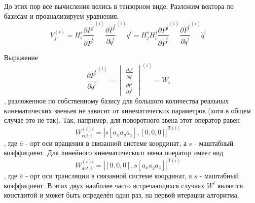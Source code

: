 \documentclass[12pt,a4paper,titlepage]{article}
\begin{document}
До этих пор все вычисления велись в тензорном виде. Разложим вектора по базисам и проанализируем уравнения.
\begin{equation}\label{basis_eq}
V^{(s)}_j = H^s_i\frac{\partial{\dot{P^j}}}{\partial{\dot{P}^i}}^{(i)}\frac{\partial{\dot{P}^i}}{\partial{\dot{q}^i}}^{(i)}\dot{q}^i=H^s_jH^j_i\frac{\partial{\dot{P^j}}}{\partial{\dot{P}^i}}^{(i)}\frac{\partial{\dot{P}^i}}{\partial{\dot{q}^i}}^{(i)}\dot{q}^i
\end{equation}

Выражение 
\begin{equation}\label{}
\frac{\partial{\dot{P}^i}}{\partial{\dot{q}^i}}^{(i)}
=
\begin{vmatrix}
\frac{\partial{\omega^i}}{\partial{\dot{q}^i}}\\
\frac{\partial{v^i}}{\partial{\dot{q}^i}}
\end{vmatrix}^{(i)}=W_i
\end{equation},
разложенное по собственному базису для большого количества реальных кинематических звеньев не зависит от кинематических параметров (хотя в общем случае это не так). Так, например, для поворотного звена этот оператор равен 
\begin{equation}\label{}
W_{rot,i}^{(i)i} = |s[a_x a_y a_z], [0, 0, 0]|^{T(i)}
\end{equation}, где $\bar{a}$ - орт оси вращения в связанной системе координат, а $s$ - маштабный коэффициент. Для линейного кинематического звена оператор имеет вид 
\begin{equation}\label{}
W_{act,i}^{(i)i} = |[0, 0, 0], s[a_x a_y a_z]|^{T(i)}
\end{equation}, где $\bar{a}$ - орт оси трансляции в связанной системе координат, а $s$ - маштабный коэффициент. 
В этих двух наиболее часто встречающихся случаях $W^i$ является константой и может быть определён один раз, на первой итерации алгоритма.
\end{document}
